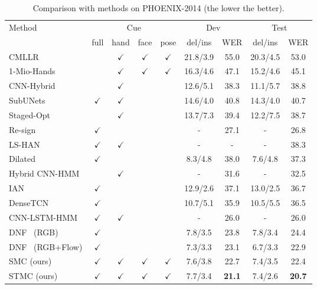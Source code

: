 \documentclass[letterpaper]{article} \usepackage{aaai20}  \usepackage{times}  \usepackage{helvet} \usepackage{courier}  \usepackage[hyphens]{url}  \usepackage{graphicx} \urlstyle{rm} \def\UrlFont{\rm}  \usepackage{graphicx}  \frenchspacing  \setlength{\pdfpagewidth}{8.5in}  \setlength{\pdfpageheight}{11in}
\def\gou{{$\checkmark$}}
\begin{document}
\begin{table*}[tp]
    \centering
    \small
    \caption{Comparison with methods on PHOENIX-2014 (the lower the better).} \label{tab:phoenix2014}
    \begin{tabular*}{0.90\textwidth}{p{6.5cm}@{\extracolsep{\fill}}|cccc|cc|cc}
    \hline
    \multirow{2}{*}{Method}         &\multicolumn{4}{c|}{Cue}        & \multicolumn{2}{c|}{Dev} & \multicolumn{2}{c}{Test} \\
                                    & full & hand & face   & pose  & del/ins  & WER  & del/ins      & WER                  \\ \hline
    CMLLR~\cite{phoenixdataset2014} &      & \gou & \gou   & \gou  & 21.8/3.9 & 55.0 & 20.3/4.5 & 53.0      \\
    1-Mio-Hands~\cite{deephand}     &      & \gou & \gou   & \gou  & 16.3/4.6 & 47.1 & 15.2/4.6 & 45.1      \\
    CNN-Hybrid~\cite{deepsign}      &      & \gou &        &       & 12.6/5.1 & 38.3 & 11.1/5.7 & 38.8      \\
    SubUNets~\cite{subunet}         & \gou & \gou &        &       & 14.6/4.0 & 40.8 & 14.3/4.0 & 40.7      \\ 
    Staged-Opt~\cite{staged}        &      & \gou &        &       & 13.7/7.3 & 39.4 & 12.2/7.5 & 38.7      \\ 
    Re-sign~\cite{resign}           & \gou &      &        &       & -        & 27.1 & -        & 26.8      \\ 
    LS-HAN~\cite{han}               & \gou & \gou &        &       & -        & -    & -        & 38.3      \\ 
    Dilated~\cite{dilated}          & \gou &      &        &       & 8.3/4.8  & 38.0 & 7.6/4.8  & 37.3      \\ 
    Hybrid CNN-HMM~\cite{koller2018ijcv} &  &\gou  &       &       & -       & 31.6 & -        & 32.5      \\ 
    IAN~\cite{ian}                  & \gou &      &        &       & 12.9/2.6 & 37.1 & 13.0/2.5 & 36.7      \\ 
    DenseTCN~\cite{densetcn}        & \gou &      &        &       & 10.7/5.1 & 35.9 & 10.5/5.5 & 36.5      \\ 
    CNN-LSTM-HMM~\cite{tpami19}     & \gou & \gou &        &       & -        & 26.0 & -        & 26.0      \\ 
    DNF~\cite{cui-tmm19} (RGB)        & \gou &      &      &       & 7.8/3.5  & 23.8 & 7.8/3.4  & 24.4      \\ 
    DNF~\cite{cui-tmm19} (RGB+Flow)   & \gou &      &      &       & 7.3/3.3  & 23.1 & 6.7/3.3  & 22.9      \\ \hline 
    SMC  (ours)                     & \gou & \gou & \gou   &\gou   & 7.6/3.8  & 22.7 & 7.4/3.5  & 22.4      \\ 
    STMC (ours)                     & \gou & \gou & \gou   &\gou   & 7.7/3.4  & \textbf{21.1} & 7.4/2.6  & \textbf{20.7}      \\ \hline

    \end{tabular*}
\end{table*}
\end{document}
